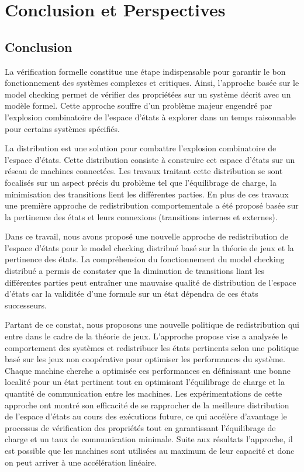 \chapter*{Conclusion et Perspectives}

\section*{Conclusion}
La vérification formelle constitue une étape indispensable pour garantir le bon fonctionnement des systèmes complexes et critiques. Ainsi, l’approche basée sur le model checking permet de vérifier des propriétées sur un système décrit avec un modèle formel. Cette approche souffre d'un problème majeur engendré par l'explosion combinatoire de l'espace d'états à explorer  dans un temps raisonnable pour certains systèmes spécifiés.

La distribution est une solution pour combattre l'explosion combinatoire de l'espace d'états. Cette distribution consiste à construire cet espace d'états sur un réseau de machines connectées. Les travaux traitant cette distribution se sont focalisés sur un aspect précis du problème tel que l’équilibrage de charge, la minimisation des transitions lient les différentes parties. En plus de ces travaux une première approche de redistribution comportementale a été proposé basée sur la pertinence des états et leurs connexions (transitions internes et externes).

Dans ce travail, nous avons proposé une nouvelle approche de redistribution de l'espace d'états pour le model checking distribué basé sur la théorie de jeux et la pertinence des états. La compréhension du fonctionnement du model checking distribué a permis de constater que la diminution de transitions liant les différentes parties peut entraîner une mauvaise qualité de distribution de l'espace d'états car la validitée d'une formule sur un état dépendra de ces états successeurs.

Partant de ce constat, nous proposons une nouvelle politique de redistribution qui entre dans le cadre de la théorie de jeux. L'approche propose vise a analysée le comportement des systèmes et redistribuer les états pertinents selon une politique basé sur les jeux non coopérative pour optimiser les performances du système. Chaque machine cherche a optimisée ces performances en définissant une bonne localité pour un état pertinent tout en optimisant l’équilibrage de charge et la quantité de communication entre les machines. Les expérimentations de cette approche ont montré son efficacité de se rapprocher de la meilleure distribution de l’espace d’états au cours des exécutions future, ce qui accélère d’avantage le processus de vérification des propriétés tout en garantissant l’équilibrage de  charge et un taux de communication minimale. Suite aux résultats l'approche, il est possible que les machines sont utilisées au maximum de leur capacité et donc on peut arriver à une accélération linéaire.

